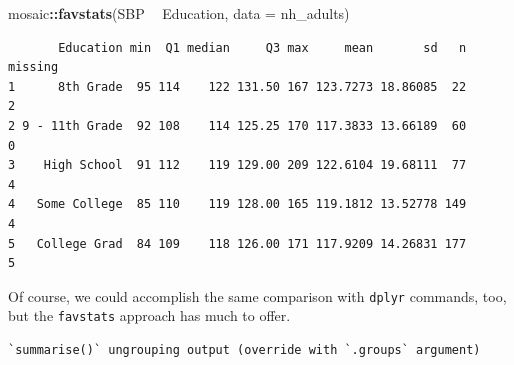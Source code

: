 \documentclass[
]{book}
\newenvironment{Shaded}{\begin{snugshade}}{\end{snugshade}}
\newcommand{\DataTypeTok}[1]{\textcolor[rgb]{0.13,0.29,0.53}{#1}}
\newcommand{\FloatTok}[1]{\textcolor[rgb]{0.00,0.00,0.81}{#1}}
\newcommand{\KeywordTok}[1]{\textcolor[rgb]{0.13,0.29,0.53}{\textbf{#1}}}
\newcommand{\NormalTok}[1]{#1}
\newcommand{\OperatorTok}[1]{\textcolor[rgb]{0.81,0.36,0.00}{\textbf{#1}}}
\newcommand{\StringTok}[1]{\textcolor[rgb]{0.31,0.60,0.02}{#1}}
\begin{document}
\begin{Shaded}
\begin{Highlighting}[]
\NormalTok{mosaic}\OperatorTok{::}\KeywordTok{favstats}\NormalTok{(SBP }\OperatorTok{~}\StringTok{ }\NormalTok{Education, }\DataTypeTok{data =}\NormalTok{ nh_adults)}
\end{Highlighting}
\end{Shaded}

\begin{verbatim}
       Education min  Q1 median     Q3 max     mean       sd   n missing
1      8th Grade  95 114    122 131.50 167 123.7273 18.86085  22       2
2 9 - 11th Grade  92 108    114 125.25 170 117.3833 13.66189  60       0
3    High School  91 112    119 129.00 209 122.6104 19.68111  77       4
4   Some College  85 110    119 128.00 165 119.1812 13.52778 149       4
5   College Grad  84 109    118 126.00 171 117.9209 14.26831 177       5
\end{verbatim}

Of course, we could accomplish the same comparison with \texttt{dplyr} commands, too, but the \texttt{favstats} approach has much to offer.

\begin{Shaded}
\end{Shaded}

\begin{verbatim}
`summarise()` ungrouping output (override with `.groups` argument)
\end{verbatim}
\end{document}
